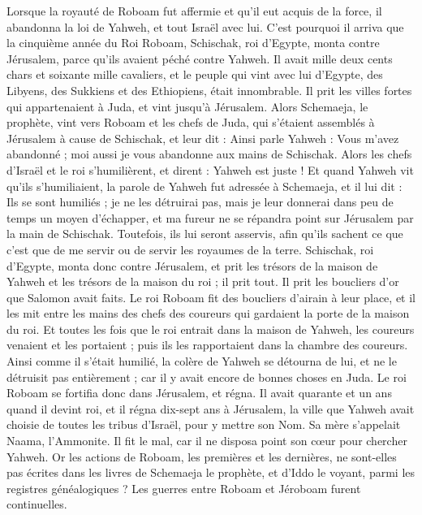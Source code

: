\begin{multicols}{2}
\VerseOne{}Lorsque la royauté de Roboam fut affermie et qu'il eut acquis de la force, il abandonna la loi de Yahweh, et tout Israël avec lui.
C'est pourquoi il arriva que la cinquième année du Roi Roboam, Schischak, roi d'Egypte, monta contre Jérusalem, parce qu'ils avaient péché contre Yahweh.
Il avait mille deux cents chars et soixante mille cavaliers, et le peuple qui vint avec lui d'Egypte, des Libyens, des Sukkiens et des Ethiopiens, était innombrable.
Il prit les villes fortes qui appartenaient à Juda, et vint jusqu'à Jérusalem.
Alors Schemaeja, le prophète, vint vers Roboam et les chefs de Juda, qui s'étaient assemblés à Jérusalem à cause de Schischak, et leur dit : Ainsi parle Yahweh : Vous m'avez abandonné ; moi aussi je vous abandonne aux mains de Schischak.
Alors les chefs d'Israël et le roi s'humilièrent, et dirent : Yahweh est juste !
Et quand Yahweh vit qu'ils s'humiliaient, la parole de Yahweh fut adressée à Schemaeja, et il lui dit : Ils se sont humiliés ; je ne les détruirai pas, mais je leur donnerai dans peu de temps un moyen d'échapper, et ma fureur ne se répandra point sur Jérusalem par la main de Schischak.
Toutefois, ils lui seront asservis, afin qu'ils sachent ce que c'est que de me servir ou de servir les royaumes de la terre.
Schischak, roi d'Egypte, monta donc contre Jérusalem, et prit les trésors de la maison de Yahweh et les trésors de la maison du roi ; il prit tout. Il prit les boucliers d'or que Salomon avait faits.
Le roi Roboam fit des boucliers d'airain à leur place, et il les mit entre les mains des chefs des coureurs qui gardaient la porte de la maison du roi.
Et toutes les fois que le roi entrait dans la maison de Yahweh, les coureurs venaient et les portaient ; puis ils les rapportaient dans la chambre des coureurs.
Ainsi comme il s'était humilié, la colère de Yahweh se détourna de lui, et ne le détruisit pas entièrement ; car il y avait encore de bonnes choses en Juda.
Le roi Roboam se fortifia donc dans Jérusalem, et régna. Il avait quarante et un ans quand il devint roi, et il régna dix-sept ans à Jérusalem, la ville que Yahweh avait choisie de toutes les tribus d'Israël, pour y mettre son Nom. Sa mère s'appelait Naama, l'Ammonite.
Il fit le mal, car il ne disposa point son cœur pour chercher Yahweh.
Or les actions de Roboam, les premières et les dernières, ne sont-elles pas écrites dans les livres de Schemaeja le prophète, et d'Iddo le voyant, parmi les registres généalogiques ? Les guerres entre Roboam et Jéroboam furent continuelles.

\end{multicols}
